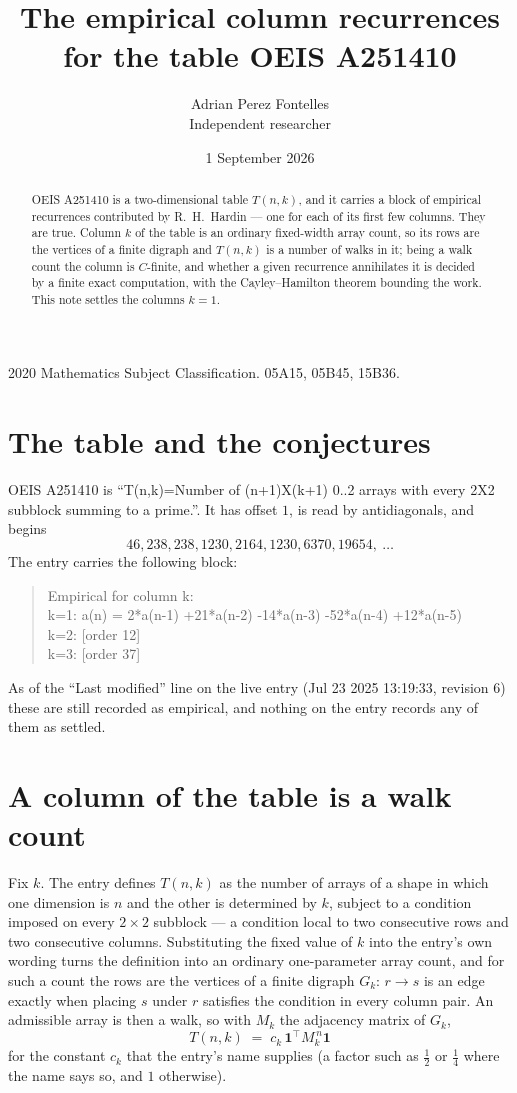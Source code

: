 \documentclass[11pt,a4paper]{article}
\title{The empirical column recurrences for the table OEIS A251410}
\author{Adrian Perez Fontelles\\ \small Independent researcher}
\date{1 September 2026}
\theoremstyle{plain}
\theoremstyle{definition}
\begin{document}
\maketitle

\begin{abstract}
OEIS A251410 is a two-dimensional table $T(n,k)$, and it carries a block of empirical
recurrences contributed by R.~H.~Hardin --- one for each of its first few columns. They are
true. Column $k$ of the table is an ordinary fixed-width array count, so its rows are the
vertices of a finite digraph and $T(n,k)$ is a number of walks in it; being a walk count the
column is $C$-finite, and whether a given recurrence annihilates it is decided by a finite
exact computation, with the Cayley--Hamilton theorem bounding the work. This note settles the
columns $k=1$.
\end{abstract}

\noindent\small 2020 Mathematics Subject Classification. 05A15, 05B45, 15B36.\normalsize

\section{The table and the conjectures}

OEIS A251410 is ``T(n,k)=Number of (n+1)X(k+1) 0..2 arrays with every 2X2 subblock summing to a prime.''. It has offset $1$, is
read by antidiagonals, and begins
\[
46, 238, 238, 1230, 2164, 1230, 6370, 19654,\ \dots
\]
The entry carries the following block:
\begin{quote}\small
Empirical for column k:\\
k=1: a(n) = 2*a(n-1) +21*a(n-2) -14*a(n-3) -52*a(n-4) +12*a(n-5)\\
k=2: [order 12]\\
k=3: [order 37]\\
\end{quote}
As of the ``Last modified'' line on the live entry (Jul 23 2025 13:19:33, revision 6) these are still
recorded as empirical, and nothing on the entry records any of them as settled.

\section{A column of the table is a walk count}

Fix $k$. The entry defines $T(n,k)$ as the number of arrays of a shape in which one dimension
is $n$ and the other is determined by $k$, subject to a condition imposed on every
$2\times2$ subblock --- a condition local to two consecutive rows and two consecutive columns.
Substituting the fixed value of $k$ into the entry's own wording turns the definition into an
ordinary one-parameter array count, and for such a count the rows are the vertices of a finite
digraph $G_k$: $r\to s$ is an edge exactly when placing $s$ under $r$ satisfies the condition
in every column pair. An admissible array is then a walk, so with $M_k$ the adjacency matrix
of $G_k$,
\[
T(n,k)\;=\;c_k\,\mathbf{1}^{\!\top}M_k^{\,n}\mathbf{1}
\]
for the constant $c_k$ that the entry's name supplies (a factor such as $\tfrac12$ or
$\tfrac14$ where the name says so, and $1$ otherwise).
\end{document}
